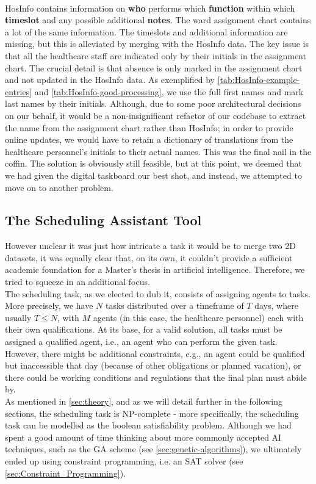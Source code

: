 \\
HosInfo contains information on \textbf{who} performs which \textbf{\gls{function}} within which \textbf{timeslot} and any possible additional \textbf{notes}. The ward assignment chart contains a lot of the same information. The timeslots and additional information are missing, but this is alleviated by merging with the HosInfo data. The key issue is that all the healthcare staff are indicated only by their initials in the assignment chart. The crucial detail is that absence is only marked in the assignment chart and not updated in the HosInfo data. As exemplified by \autoref{tab:HosInfo-example-entries} and \autoref{tab:HosInfo-good-processing}, we use the full first names and mark last names by their initials. Although, due to some poor architectural decisions on our behalf,  it would be a non-insignificant refactor of our codebase to extract the name from the assignment chart rather than HosInfo; in order to provide online updates, we would have to retain a \gls{dictionary} of translations from the healthcare personnel's initials to their actual names. This was the final nail in the coffin. The solution is obviously still feasible, but at this point, we deemed that we had given the digital taskboard our best shot, and instead, we attempted to move on to another problem.

\subsection{The Scheduling Assistant Tool}
However unclear it was just how intricate a task it would be to merge two 2D datasets, it was equally clear that, on its own, it couldn't provide a sufficient academic foundation for a Master's thesis in artificial intelligence. Therefore, we tried to squeeze in an additional focus.
\\
The scheduling task, as we elected to dub it, consists of assigning agents to tasks. More precisely, we have \(N\) tasks distributed over a timeframe of \(T\) days, where usually \(T \leq N\), with \(M\) agents (in this case, the healthcare personnel) each with their own qualifications. At its base, for a valid solution, all tasks must be assigned a qualified agent, i.e., an agent who can perform the given task. However, there might be additional constraints, e.g., an agent could be qualified but inaccessible that day (because of other obligations or planned vacation), or there could be working conditions and regulations that the final plan must abide by.
\\
As mentioned in \autoref{sec:theory}, and as we will detail further in the following sections, the scheduling task is NP-complete - more specifically, the scheduling task can be modelled as the boolean satisfiability problem. Although we had spent a good amount of time thinking about more commonly accepted AI techniques, such as the GA scheme (see \autoref{sec:genetic-algorithms}), we ultimately ended up using constraint programming, i.e. an SAT solver (see \autoref{sec:Constraint_Programming}).

